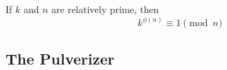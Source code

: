 \documentclass[handout]{mcs}
\begin{document}
{\begin{theorem*}
If $k$ and $n$ are relatively prime, then
\[
k^{\phi(n)} \equiv 1 \pmod{n}
\]
\end{theorem*}

\iffalse

\begin{corollary*}
If $k$ and $n$ are relatively prime, then $k^{\phi(n)-1}$ is an inverse
modulo $n$ of $k$.
\end{corollary*}

\textbf{Remark:} Using fast exponentiation to compute $k^{\phi(n)-1}$ is
another efficient way to compute an inverse modulo $n$ of $k$.
\fi

\subsection*{The Pulverizer}

}
\end{document}
